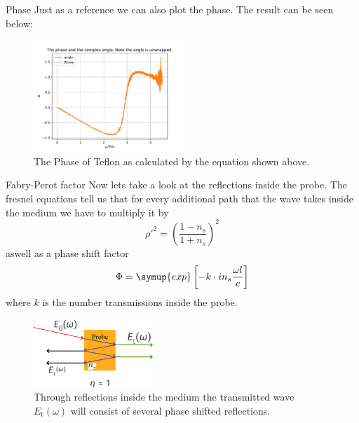 \documentclass[aspectratio=1610, 9pt]{beamer}
\begin{document}
\begin{frame}{Phase}
  Just as a reference we can also plot the phase.
  The result can be seen below:
  \begin{center}
    \begin{figure}
      \includegraphics[width=0.5\textwidth]{images/THzPhase.pdf}
      \caption{The Phase of Teflon as calculated by the equation shown above.}
    \end{figure}
  \end{center}
\end{frame}


\begin{frame}{Fabry-Perot factor}
  Now lets take a look at the reflections inside the probe.
  The fresnel equations tell us that for every additional path that the wave takes inside the medium we have to multiply it by 
  \begin{equation}
    \rho'^2 = \left(\frac{1 - n_s}{1 + n_s}\right)^2
  \end{equation}
  aswell as a phase shift factor 
  \begin{equation}
    \Phi = \symup{exp}\left[-k \cdot i n_s \frac{\omega l}{c}\right]
  \end{equation}
  where $k$ is the number transmissions inside the probe.
  \begin{figure}
    \includegraphics[width=0.4\textwidth]{images/Perot.pdf}
    \caption{Through reflections inside the medium the transmitted wave $E_\text{t}(\omega)$ will consist of several phase shifted reflections.}
  \end{figure}
\end{frame}
\end{document}
